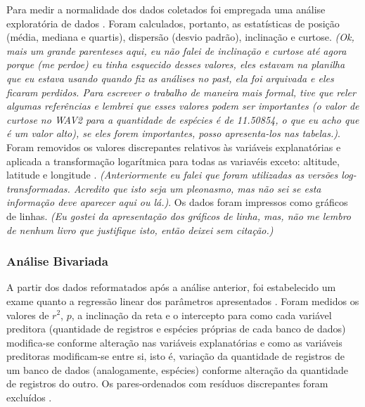 Para medir a normalidade dos dados coletados foi empregada uma análise exploratória de dados \cite{NicholasJ.Gotelli;AaronM.Ellison2010,Field2012, Borcard2011}. Foram calculados, portanto, as estatísticas de posição (média, mediana e quartis), dispersão (desvio padrão), inclinação e curtose.  \color{blue}\textit{(Ok, mais um grande parenteses aqui, eu não falei de inclinação e curtose até agora porque (me perdoe) eu tinha esquecido desses valores, eles estavam na planilha que eu estava usando quando fiz as análises no past, ela foi arquivada e eles ficaram perdidos. Para escrever o trabalho de maneira mais formal, tive que reler algumas referências e lembrei que esses valores podem ser importantes (o valor de curtose no WAV2 para a quantidade de espécies é de 11.50854, o que eu acho que é um valor alto), se eles forem importantes, posso apresenta-los nas tabelas.)}\color{black}. Foram removidos os valores discrepantes relativos às variáveis explanatórias \cite{VALENTIN2000,Field2012} e aplicada a transformação logarítmica para todas as variavéis exceto: altitude, latitude e longitude \cite{NicholasJ.Gotelli;AaronM.Ellison2010,Field2012,Borcard2011}. \color{blue}\textit{(Anteriormente eu falei que foram utilizadas as versões log-transformadas. Acredito que isto seja um pleonasmo, mas não sei se esta informação deve aparecer aqui ou lá.)}\color{black}. Os dados foram impressos como gráficos de linhas. \color{blue}\textit{(Eu gostei da apresentação dos gráficos de linha, mas, não me lembro de nenhum livro que justifique isto, então deixei sem citação.)}\color{black}



\subsubsection{Análise Bivariada}

A partir dos dados reformatados após a análise anterior, foi estabelecido um exame quanto a regressão linear dos parâmetros apresentados \cite{NicholasJ.Gotelli;AaronM.Ellison2010}. Foram medidos os valores de $r^2$, $p$, a inclinação da reta e o intercepto para como cada variável preditora (quantidade de registros e espécies próprias de cada banco de dados) modifica-se conforme alteração nas variáveis explanatórias e como as variáveis preditoras modificam-se entre si, isto é, variação da quantidade de registros de um banco de dados (analogamente, espécies) conforme alteração da quantidade de registros do outro. Os pares-ordenados com resíduos discrepantes foram excluídos \cite{Field2012}.

